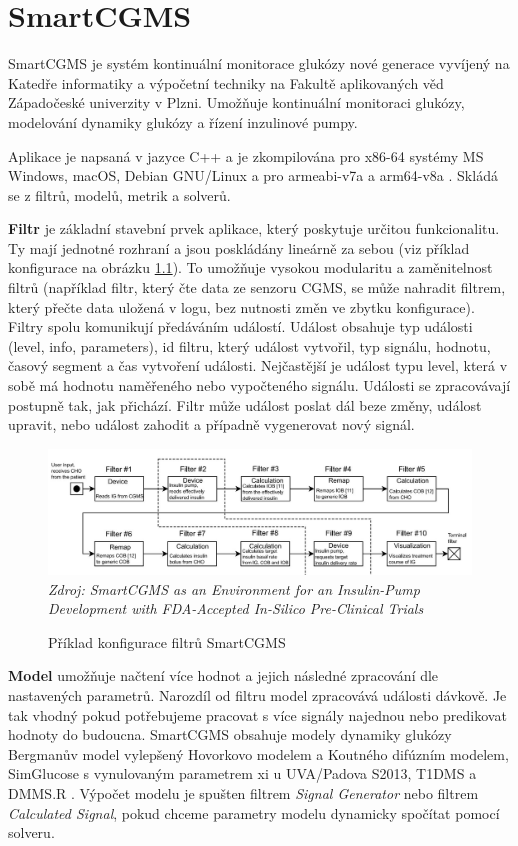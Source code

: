 \chapter{SmartCGMS}

SmartCGMS je systém kontinuální monitorace glukózy nové generace vyvíjený na Katedře informatiky a výpočetní techniky na Fakultě aplikovaných věd Západočeské univerzity v Plzni. Umožňuje kontinuální monitoraci glukózy, modelování dynamiky glukózy a řízení inzulinové pumpy.

Aplikace je napsaná v jazyce C++ a je zkompilována pro x86-64 systémy MS Windows, macOS, Debian GNU/Linux a pro armeabi-v7a a arm64-v8a \citep{cgms.koutny}. Skládá se z filtrů, modelů, metrik a solverů.

\textbf{Filtr} je základní stavební prvek aplikace, který poskytuje určitou funkcionalitu. Ty mají jednotné rozhraní a jsou poskládány lineárně za sebou (viz příklad konfigurace na obrázku \ref{fig:scgms_filters}). To umožňuje vysokou modularitu a zaměnitelnost filtrů (například filtr, který čte data ze senzoru CGMS, se může nahradit filtrem, který přečte data uložená v logu, bez nutnosti změn ve zbytku konfigurace). Filtry spolu komunikují předáváním událostí. Událost obsahuje typ události (level, info, parameters), id filtru, který událost vytvořil, typ signálu, hodnotu, časový segment a čas vytvoření události. Nejčastější je událost typu level, která v sobě má hodnotu naměřeného nebo vypočteného signálu. Události se zpracovávají postupně tak, jak přichází. Filtr může událost poslat dál beze změny, událost upravit, nebo událost zahodit a případně vygenerovat nový signál.

\begin{figure}[H]
\caption{Příklad konfigurace filtrů SmartCGMS}
\label{fig:scgms_filters}
\centering
\includegraphics[width=1\textwidth]{img/scgms/filters.jpg}
\textit{Zdroj: SmartCGMS as an Environment for an Insulin-Pump  Development with FDA-Accepted In-Silico Pre-Clinical Trials \citep{cgms.ubl}}
\end{figure}

\textbf{Model} umožňuje načtení více hodnot a jejich následné zpracování dle nastavených parametrů. Narozdíl od filtru model zpracovává události dávkově. Je tak vhodný pokud potřebujeme pracovat s více signály najednou nebo predikovat hodnoty do budoucna. SmartCGMS obsahuje modely dynamiky glukózy Bergmanův model vylepšený Hovorkovo modelem a Koutného difúzním modelem, SimGlucose s vynulovaným parametrem xi u UVA/Padova S2013, T1DMS a DMMS.R \citep{cgms.web}. Výpočet modelu je spušten filtrem \textit{Signal Generator} nebo filtrem \textit{Calculated Signal}, pokud chceme  parametry modelu dynamicky spočítat pomocí solveru.

